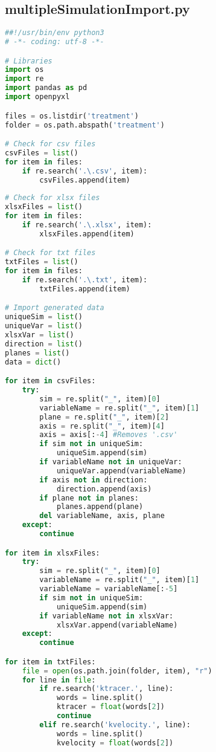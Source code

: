 \subsection{multipleSimulationImport.py}
\begin{lstlisting}[language=python]
##!/usr/bin/env python3
# -*- coding: utf-8 -*-

# Libraries
import os
import re
import pandas as pd
import openpyxl

files = os.listdir('treatment')
folder = os.path.abspath('treatment')

# Check for csv files
csvFiles = list()
for item in files:
    if re.search('.\.csv', item):
        csvFiles.append(item)
        
# Check for xlsx files
xlsxFiles = list()
for item in files:
    if re.search('.\.xlsx', item):
        xlsxFiles.append(item)

# Check for txt files
txtFiles = list()
for item in files:
    if re.search('.\.txt', item):
        txtFiles.append(item)

# Import generated data
uniqueSim = list()
uniqueVar = list()
xlsxVar = list()
direction = list()
planes = list()
data = dict()

for item in csvFiles:
    try:
        sim = re.split("_", item)[0]
        variableName = re.split("_", item)[1]
        plane = re.split("_", item)[2]
        axis = re.split("_", item)[4]
        axis = axis[:-4] #Removes '.csv'
        if sim not in uniqueSim:
            uniqueSim.append(sim)
        if variableName not in uniqueVar:
            uniqueVar.append(variableName)
        if axis not in direction:
            direction.append(axis)
        if plane not in planes:
            planes.append(plane)
        del variableName, axis, plane
    except:
        continue

for item in xlsxFiles:
    try:
        sim = re.split("_", item)[0]
        variableName = re.split("_", item)[1]
        variableName = variableName[:-5]
        if sim not in uniqueSim:
            uniqueSim.append(sim)
        if variableName not in xlsxVar:
            xlsxVar.append(variableName)
    except:
        continue

for item in txtFiles:
    file = open(os.path.join(folder, item), "r")
    for line in file:
        if re.search('ktracer.', line):
            words = line.split()
            ktracer = float(words[2])
            continue
        elif re.search('kvelocity.', line):
            words = line.split()
            kvelocity = float(words[2])


\end{lstlisting}
